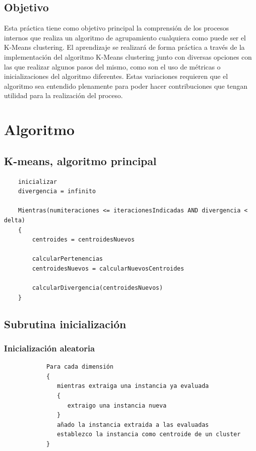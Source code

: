 \documentclass[a4paper]{report}
\begin{document}
	\section{Objetivo}
	
	Esta práctica tiene como objetivo principal la comprensión de los procesos internos que realiza un algoritmo de agrupamiento cualquiera como puede ser el K-Means clustering. El aprendizaje se realizará de forma práctica a través de la implementación del algoritmo K-Means clustering junto con diversas opciones con las que realizar algunos pasos del mismo, como son el uso de métricas o inicializaciones del algoritmo diferentes.	Estas variaciones requieren que el algoritmo sea entendido plenamente para poder hacer contribuciones que tengan utilidad para la realización del proceso.
	
\chapter{Algoritmo}

	\section{K-means, algoritmo principal}
	
	\begin{verbatim}
	inicializar
	divergencia = infinito 
	
	Mientras(numiteraciones <= iteracionesIndicadas AND divergencia < delta)
	{
	    centroides = centroidesNuevos 
	
	    calcularPertenencias
	    centroidesNuevos = calcularNuevosCentroides
		
	    calcularDivergencia(centroidesNuevos) 
	}
	\end{verbatim}
	
	\section{Subrutina inicialización}
		\subsection{Inicialización aleatoria}
			\begin{verbatim}
			Para cada dimensión
			{
			   mientras extraiga una instancia ya evaluada
			   {
			      extraigo una instancia nueva
			   }
			   añado la instancia extraida a las evaluadas
			   establezco la instancia como centroide de un cluster
			}
			\end{verbatim}
		
\end{document}

